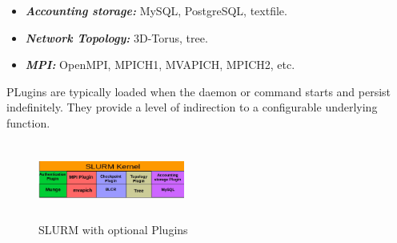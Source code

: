\documentclass{acm_proc_article-sp}
\begin{document}
\begin{itemize}
\item \textbf{\textit{Accounting storage:}} MySQL, PostgreSQL, textfile.
\item \textbf{\textit{Network Topology:}} 3D-Torus, tree.
\item \textbf{\textit{MPI:}} OpenMPI, MPICH1, MVAPICH, MPICH2, etc.
\end{itemize}
PLugins are typically loaded when the daemon or command starts and persist indefinitely. They provide a level of indirection to a configurable underlying function.
\begin{figure}
\centering
\includegraphics[width=0.43\textwidth, height=25mm]{./plugin.eps}
\caption{SLURM with optional Plugins}
\label{fig:1}
\end{figure}
\end{document}
